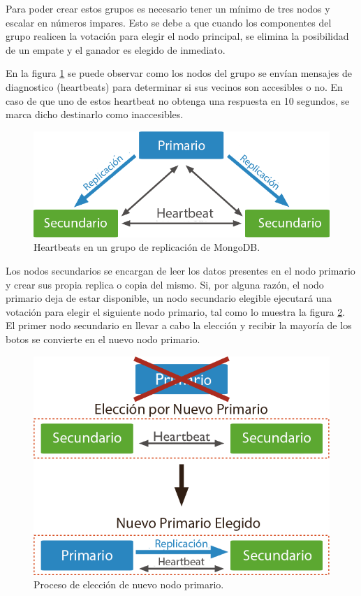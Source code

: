 Para poder crear estos grupos es necesario tener un mínimo de tres nodos y escalar en números impares. Esto se
debe a que cuando los componentes del grupo realicen la votación para elegir el nodo principal, se elimina la posibilidad de un
empate y el ganador es elegido de inmediato.

En la figura \ref{fig:heartbeat} se puede observar como los nodos del grupo se envían mensajes de diagnostico (heartbeats) para determinar
si sus vecinos son accesibles o no. En caso de que uno de estos heartbeat no obtenga una respuesta en 10 segundos, se marca dicho
destinarlo como inaccesibles.

\begin{figure}[H]
	\centering
		\includegraphics[width=.6\textwidth]{figures/heartbeat}
	\caption{Heartbeats en un grupo de replicación de MongoDB.}
	\label{fig:heartbeat}
\end{figure}


Los nodos secundarios se encargan de leer los datos presentes en el nodo primario y crear sus propia replica o copia del mismo.
Si, por alguna razón, el nodo primario deja de estar disponible, un nodo secundario elegible ejecutará una votación para
elegir el siguiente nodo primario, tal como lo muestra la figura \ref{fig:failover}.
El primer nodo secundario en llevar a cabo la elección y recibir la mayoría de los botos se convierte en el nuevo nodo primario.


\begin{figure}[H]
	\centering
		\includegraphics[width=.6\textwidth]{figures/failover}
	\caption{Proceso de elección de nuevo nodo primario.}
	\label{fig:failover}
\end{figure}


